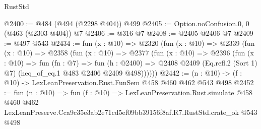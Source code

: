 \begin{lexlean}{RustStd}
\begin{coremodule}
@2400 := @484 (@494 (@2298 @404)) @499
@2405 := Option.noConfusion.{0, 0} (@463 (@2303 @404)) @7
@2406 := @316 @7
@2408 := @2405 @2406 @7
@2409 := @497 @543
@2434 := fun (x : @10) =>
  @2320
    (fun (x : @10) =>
    @2339
      (fun (x : @10) =>
      @2358
        (fun (x : @10) =>
        @2377
          (fun (x : @10) =>
          @2396
            (fun (x : @10) =>
            fun (fn : @7) =>
            fun (h : @2400) =>
            @2408 @2409 (Eq.refl.{2} (Sort 1) @7) (heq_of_eq.{1} @483 @2406 @2409 @498))))))
@2442 := (n : @10) -> (f : @10) -> LexLeanPreservation.Rust.FunSem @458 @460 @462 @543 @498
@2452 := fun (n : @10) =>
  fun (f : @10) =>
  LexLeanPreservation.Rust.simulate
    @458
    @460
    @462
    LexLeanPreserve.Cca9c35e3ab2e71cd5ef09bb39156f8af.R7.RustStd.crate_ok
    @543
    @498
\end{coremodule}
\end{lexlean}
